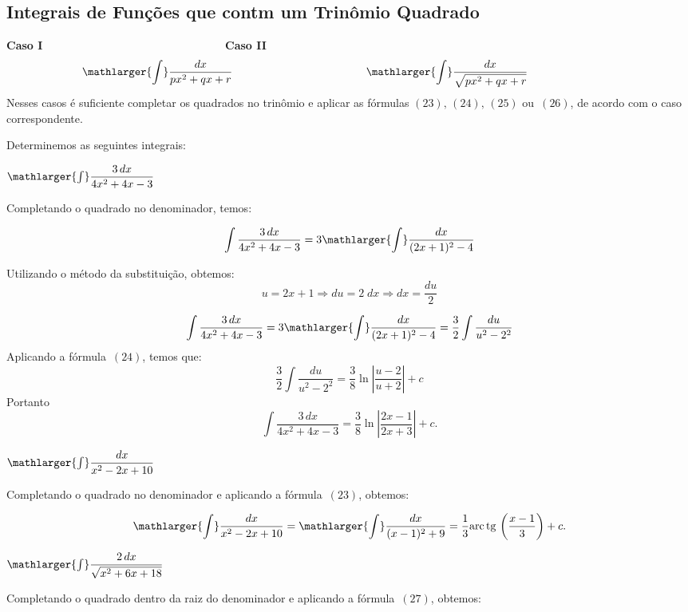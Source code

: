 \cleardoublepage\documentclass[../main.tex]{subfiles}
\begin{document}
\subsection{Integrais de Funções que contm um Trinômio Quadrado}\hypertarget{TrinQuad}{}
\textbf{\hypertarget{TrinQuadCasoI}{Caso I}} \(\qquad \qquad \qquad \qquad\qquad \qquad \qquad \qquad\)\textbf{\hypertarget{TrinQuadCasoII}{Caso II}}
\[ \mathlarger{\int}\dfrac{dx}{px^2+qx+r}\qquad \qquad \qquad \qquad \qquad \qquad\mathlarger{\int}\dfrac{dx}{\sqrt{px^2+qx+r}}\qquad \qquad \qquad \qquad \]
Nesses casos é suficiente completar os quadrados no trinômio e aplicar as fórmulas \((23),\,(24),\,(25)\) ou \(\,(26)\), de acordo com o caso correspondente.
\begin{ex}
Determinemos as seguintes integrais:
\begin{compactenum}[a)]
\item \(\mathlarger{\int}\dfrac{3\,dx}{4x^2+4x-3}\)\\

\begin{solution}
Completando o quadrado no denominador, temos:

\[ \int \dfrac{3\,dx}{4x^2+4x-3}= 3 \mathlarger{\int}\dfrac{dx}{(2x+1)^2-4}\]

Utilizando o método da substituição, obtemos:
\[u=2x+1\Rightarrow du=2\;dx\Rightarrow dx=\frac{du}{2}\]

\[ \int \dfrac{3\,dx}{4x^2+4x-3}= 3 \mathlarger{\int}\dfrac{dx}{(2x+1)^2-4}=\frac{3}{2}\int \frac{du}{u^2-2^2}\]
Aplicando  a fórmula \(\,(24)\), temos que:
$$\frac{3}{2}\int \frac{du}{u^2-2^2}=\frac{3}{8} \ln \left| \dfrac{u-2}{u+2}\right| +c$$
Portanto 
\[\int \dfrac{3\,dx}{4x^2+4x-3}=\dfrac{3}{8} \ln \left| \dfrac{2x-1}{2x+3}\right| +c . \]
\end{solution}
\item \(\mathlarger{\int}\dfrac{dx}{x^2-2x+10}\)\\

\begin{solution}
Completando o quadrado no denominador e aplicando a fórmula \(\,(23)\), obtemos:

\[ \mathlarger{\int}\dfrac{dx}{x^2-2x+10} = \mathlarger{\int}\dfrac{dx}{(x-1)^2+9}= \dfrac{1}{3}{\rm arc\,tg\,} \left(\dfrac{x-1}{3} \right)+c. \]
\end{solution}
\item \(\mathlarger{\int}\dfrac{2\,dx}{\sqrt{x^2+6x+18}}\)\\

\begin{solution}
Completando o quadrado dentro da raiz do denominador e aplicando a fórmula \(\,(27)\), obtemos:


\end{solution}
\end{compactenum}
\end{ex}
\end{document}
